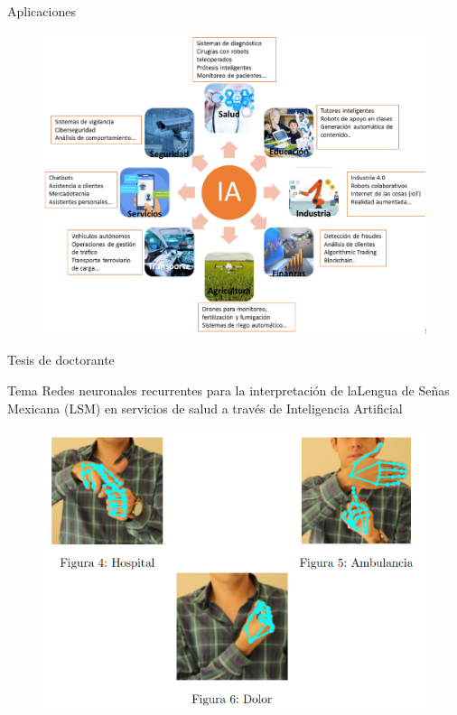 \documentclass[11pt,aspectratio=169]{beamer}
\begin{document}
\begin{frame}{Aplicaciones}
    \begin{figure}
        \centering
        \includegraphics[scale=0.35]{img/aplicacionesIA.png}
    \end{figure}
\end{frame}

\begin{frame}{Tesis de doctorante}
    \begin{block}{Tema}
        Redes neuronales recurrentes para la interpretación de laLengua de Señas Mexicana (LSM) 
        en servicios de salud a través de Inteligencia Artificial
    \end{block}     
    \begin{figure}
        \centering
        \includegraphics[scale=0.45]{img/LenguajeSenas.png}
    \end{figure}
\end{frame}
\end{document}
